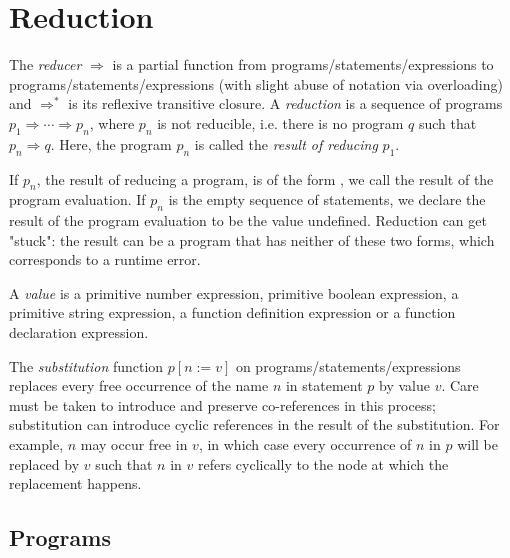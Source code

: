 

\section*{Reduction}

The \emph{reducer} $\Rightarrow$ is a partial function from
programs/statements/expressions to
programs/statements/expressions (with slight abuse of notation
via overloading)
and $\Rightarrow^*$ is its reflexive transitive closure.
A \emph{reduction} is a sequence of programs
$p_1 \Rightarrow \cdots \Rightarrow p_n$,
where $p_n$ is not reducible, i.e. there is no
program $q$ such that $p_n \Rightarrow q$.
Here, the program $p_n$ is called the \emph{result
of reducing} $p_1$.

If $p_n$, the result of reducing a program, is of the form , 
we call  the result of the program evaluation. If $p_n$ is the empty
sequence of statements, we declare the result of the program evaluation to be
the value undefined. Reduction can get "stuck": the result can be a program
that has neither of these two forms, which corresponds to a runtime error.

A \emph{value} is a primitive number expression,
primitive boolean expression,
a primitive string expression, a function definition
expression or a function declaration expression.

The \emph{substitution} function
$p [ n := v ]$ on programs/statements/expressions
replaces every free occurrence of the name $n$
in statement $p$ by value $v$. Care must be taken to introduce
and preserve
co-references in this process; substitution can introduce
cyclic references in the result of the substitution. For example,
$n$ may occur free in $v$, in which case
every occurrence of $n$ in $p$
will be replaced by $v$ such that $n$ in $v$ refers cyclically
to the node at which the replacement happens.

\subsection*{Programs}



